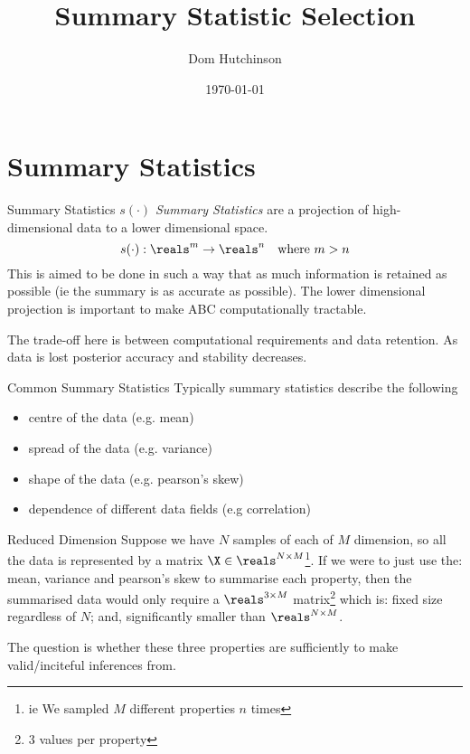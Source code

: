 \documentclass[11pt,a4paper]{article}
\begin{document}
\setcounter{section}{1}

\title{Summary Statistic Selection}
\author{Dom Hutchinson}
\date{\today}
\maketitle

\section*{Summary Statistics}

  \begin{definition}{Summary Statistics $s(\cdot)$}
    \textit{Summary Statistics} are a projection of high-dimensional data to a lower dimensional space.
    \[ s(\cdot):\reals^m\to\reals^n\quad\text{where }m>n \]
    This is aimed to be done in such a way that as much information is retained as possible (ie the summary is as accurate as possible). The lower dimensional projection is important to make ABC computationally tractable.
    \par The trade-off here is between computational requirements and data retention. As data is lost posterior accuracy and stability decreases.
  \end{definition}

  \begin{proposition}{Common Summary Statistics}
    Typically summary statistics describe the following
    \begin{itemize}
      \item centre of the data (e.g. mean)
      \item spread of the data (e.g. variance)
      \item shape of the data (e.g. pearson's skew)
      \item dependence of different data fields (e.g correlation)
    \end{itemize}
  \end{proposition}

  \begin{remark}{Reduced Dimension}
    Suppose we have $N$ samples of each of $M$ dimension, so all the data is represented by a matrix $\X\in\reals^{N\times M}$\footnote{ie We sampled $M$ different properties $n$ times}. If we were to just use the: mean, variance and pearson's skew to summarise each property, then the summarised data would only require a $\reals^{3\times M}$ matrix\footnote{3 values per property} which is: fixed size regardless of $N$; and, significantly smaller than $\reals^{N\times M}$.
    \par The question is whether these three properties are sufficiently to make valid/inciteful inferences from.
  \end{remark}
\end{document}
